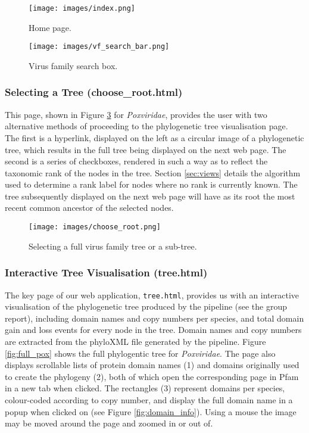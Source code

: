 \documentclass[12pt,a4paper]{article}
\begin{document}
\begin{figure}[H]
\centering
\texttt{[image: images/index.png]}
\caption{Home page.}
\label{fig:index}
\end{figure}

\begin{figure}[h]
\centering
\texttt{[image: images/vf\_search\_bar.png]}
\caption{Virus family search box.}
\label{sec:vf_name_search}
\end{figure}

\subsubsection{Selecting a Tree (choose\_root.html)}
This page, shown in Figure \ref{fig:choose_root} for \textit{Poxviridae}, provides the user with two alternative methods of proceeding to the phylogenetic tree visualisation page. The first is a hyperlink, displayed on the left as a circular image of a phylogenetic tree, which results in the full tree being displayed on the next web page. The second is a series of checkboxes, rendered in such a way as to reflect the taxonomic rank of the nodes in the tree. Section \ref{sec:views} details the algorithm used to determine a rank label for nodes where no rank is currently known. The tree subsequently displayed on the next web page will have as its root the most recent common ancestor of the selected nodes.

\begin{figure}[h]
\centering
\texttt{[image: images/choose\_root.png]}
\caption{Selecting a full virus family tree or a sub-tree.}
\label{fig:choose_root}
\end{figure}

\subsubsection{Interactive Tree Visualisation (tree.html)}
The key page of our web application, \texttt{tree.html}, provides us with an interactive visualisation of the phylogenetic tree produced by the pipeline (see the group report), including domain names and copy numbers per species, and total domain gain and loss events for every node in the tree. Domain names and copy numbers are extracted from the phyloXML file generated by the pipeline. Figure \ref{fig:full_pox} shows the full phylogentic tree for \textit{Poxviridae}. The page also displays scrollable lists of protein domain names (1) and domains originally used to create the phylogeny (2), both of which open the corresponding page in Pfam in a new tab when clicked. The rectangles (3) represent domains per species, colour-coded according to copy number, and display the full domain name in a popup when clicked on (see Figure \ref{fig:domain_info}). Using a mouse the image may be moved around the page and zoomed in or out of.
\end{document}
